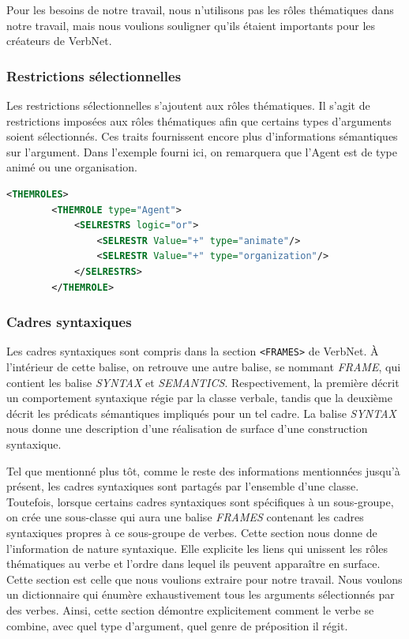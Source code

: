 Pour les besoins de notre travail, nous n'utilisons pas les rôles thématiques dans notre travail, mais nous voulions souligner qu'ils étaient importants pour les créateurs de VerbNet. 

\subsubsection{Restrictions sélectionnelles}

Les restrictions sélectionnelles s'ajoutent aux rôles thématiques. Il s'agit de restrictions imposées aux rôles thématiques afin que certains types d'arguments soient sélectionnés.
Ces traits fournissent encore plus d'informations sémantiques sur l'argument. Dans l'exemple fourni ici, on remarquera que l'Agent est de type animé ou une organisation.

\begin{lstlisting}[language=Xml, caption = Les restrictions sélectionnelles]
    <THEMROLES>
        <THEMROLE type="Agent">
            <SELRESTRS logic="or">
                <SELRESTR Value="+" type="animate"/>
                <SELRESTR Value="+" type="organization"/>
            </SELRESTRS>
        </THEMROLE>
\end{lstlisting}

\subsubsection{Cadres syntaxiques}

Les cadres syntaxiques sont compris dans la section \lstinline{<FRAMES>} de VerbNet. À l'intérieur de cette balise, on retrouve une autre balise, se nommant \emph{FRAME}, qui contient les balise \emph{SYNTAX} et \emph{SEMANTICS}. Respectivement, la première décrit un comportement syntaxique régie par la classe verbale, tandis que la deuxième décrit les prédicats sémantiques impliqués pour un tel cadre. La balise \emph{SYNTAX} nous donne une description d'une réalisation de surface d'une construction syntaxique.

Tel que mentionné plus tôt, comme le reste des informations mentionnées jusqu'à présent, les cadres syntaxiques sont partagés par l'ensemble d'une classe. Toutefois, lorsque certains cadres syntaxiques sont spécifiques à un sous-groupe, on crée une sous-classe qui aura une balise \emph{FRAMES} contenant les cadres syntaxiques propres à ce sous-groupe de verbes. Cette section nous donne de l'information de nature syntaxique. Elle explicite les liens qui unissent les rôles thématiques au verbe et l'ordre dans lequel ils peuvent apparaître en surface. Cette section est celle que nous voulions extraire pour notre travail. Nous voulons un dictionnaire qui énumère exhaustivement tous les arguments sélectionnés par des verbes. Ainsi, cette section démontre explicitement comment le verbe se combine, avec quel type d'argument, quel genre de préposition il régit.

